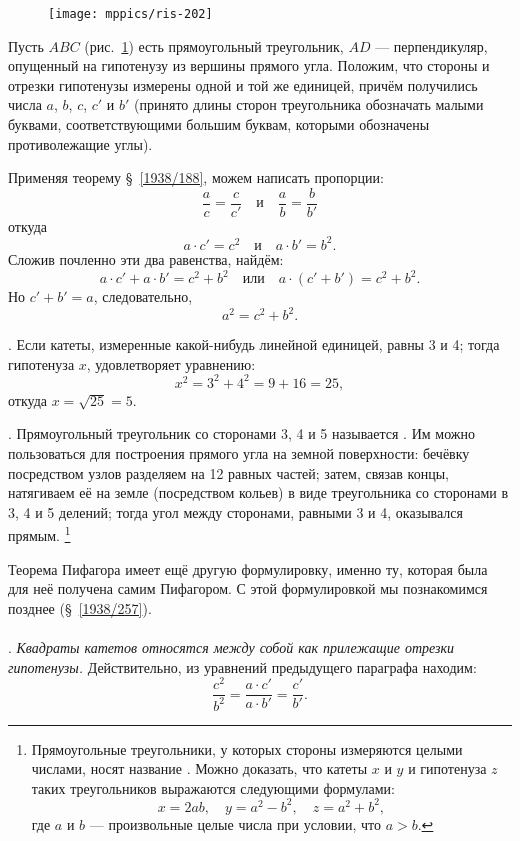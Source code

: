 \documentclass[oneside]{book}
\begin{document}
\begin{figure}
\centering
\texttt{[image: mppics/ris-202]}
\caption{}\label{1938/ris-202}
\end{figure}

Пусть $ABC$ (рис.~\ref{1938/ris-202}) есть прямоугольный треугольник, $AD$ — перпендикуляр, опущенный на гипотенузу из вершины прямого угла.
Положим, что стороны и отрезки гипотенузы измерены одной и той же единицей, причём получились числа $a$, $b$, $c$, $c'$ и $b'$ (принято длины сторон треугольника обозначать малыми буквами, соответствующими большим буквам, которыми обозначены противолежащие углы). %

Применяя теорему §~\ref{1938/188}, можем написать пропорции:
\[\frac ac=\frac c{c'}
\quad\text{и}\quad
\frac ab=\frac b{b'}\]
откуда 
\[a\cdot c'=c^2
\quad\text{и}\quad
a\cdot b'=b^2.\]
Сложив почленно эти два равенства, найдём:
\[a\cdot c'+a\cdot b'=c^2+b^2
\quad\text{или}\quad
a\cdot (c'+b')=c^2+b^2.\]
Но $c'+b'=a$, следовательно,
\[a^2=c^2+b^2.\]

\smallskip
{}.
Если катеты, измеренные какой-нибудь линейной единицей, равны 3 и 4; 
тогда гипотенуза  $x$, удовлетворяет уравнению:
\[x^2=3^2+4^2=9+16=25,\]
откуда $x = \sqrt{25} = 5$.

\smallskip
{}.
Прямоугольный треугольник со сторонами 3, 4 и 5 называется . 
Им можно пользоваться для построения прямого угла на земной поверхности:
бечёвку посредством узлов разделяем на 12 равных частей;
затем, связав концы, натягиваем её на земле (посредством кольев) в виде треугольника со сторонами в 3, 4 и 5 делений;
тогда угол между сторонами, равными 3 и 4, оказывался прямым.%
\footnote{Прямоугольные треугольники, у которых стороны измеряются целыми числами, носят название .
Можно доказать, что катеты $x$ и $y$ и гипотенуза $z$ таких треугольников выражаются следующими формулами:
\[x=2ab,
\quad
y=a^2-b^2,
\quad
z=a^2+b^2,\]
где $a$ и $b$ — произвольные целые числа при условии, что $a>b$.%
}

Теорема Пифагора имеет ещё другую формулировку, именно ту, которая была для неё получена самим Пифагором.
С этой формулировкой мы познакомимся позднее (§~\ref{1938/257}).

\paragraph{}\label{1938/192}
.
\emph{Квадраты катетов относятся между собой как прилежащие отрезки гипотенузы.}
Действительно, из уравнений предыдущего параграфа находим:
\[\frac{c^2}{b^2}=\frac{a\cdot c'}{a\cdot b'}=\frac{c'}{b'}.\]
\end{document}
